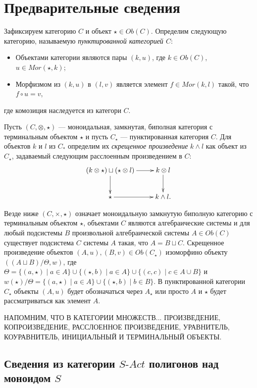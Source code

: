 \documentclass[a4paper,12pt]{article}
\newcommand{\SAct}{S\text{-}Act}
\begin{document}
\section*{Предварительные сведения}

Зафиксируем категорию $C$ и объект $\star \in Ob(C)$. Определим следующую категорию, называемую \textit{пунктированной категорией $C$}:
\begin{itemize}
    \item Объектами категории являются пары $(k,u)$, где $k \in Ob(C)$, $u \in Mor(\star,k)$;
    \item Морфизмом из $(k,u)$ в $(l,v)$ является элемент $f \in Mor(k,l)$ такой, что $f \circ u = v$,
\end{itemize}
где комозиция наследуется из категори $C$.

Пусть $(C,\otimes,\star)$ --- моноидальная, замкнутая, биполная категория с терминальным объектом $\star$ и пусть $C_\star$ --- пунктированная категория $C$. Для объектов $k$ и $l$ из $C_*$ определим их \textit{скрещенное произведение} $k \wedge l$ как объект из $C_\star$, задаваемый следующим расслоенным произведением в $C$:
$$\xymatrix{
    (k \otimes \star) \sqcup (\star \otimes l) \ar[r] \ar[d] & k \otimes l \ar[d]\\
    \star \ar[r] & k \wedge l.
}$$

Везде ниже $(C,\times,\star)$ означает моноидальную замкнутую биполную категорию с терминальным объектом $\star$, объектами $C$ являются алгебраические системы и для любый подсистемы $B$ произвольной алгебраической системы $A \in Ob(C)$ существует подсистема $C$ системы $A$ такая, что $A = B \sqcup C$. Скрещенное произведение объектов $(A,u), (B,v) \in Ob(C_\star)$ изоморфино объекту $((A \sqcup B)/\Theta, w)$, где $\Theta = \{(a,\star) \mid a \in A\} \cup \{(\star,b) \mid a \in A\} \cup \{(c,c) \mid c \in A \cup B\}$ и $w(\star)/\Theta = \{(a,\star) \mid a \in A\} \cup \{(\star,b) \mid b \in B\}$. В пунктированной категории $C_\star$ объекты $(A,u)$ будет обозначаться через $A_\star$ или просто $A$ и $\star$ будет рассматриваться как элемент $A$.

НАПОМНИМ, ЧТО В КАТЕГОРИИ МНОЖЕСТВ... ПРОИЗВЕДЕНИЕ, КОПРОИЗВЕДЕНИЕ, РАССЛОЕННОЕ ПРОИЗВЕДЕНИЕ, УРАВНИТЕЛЬ, КОУРАВНИТЕЛЬ, ИНИЦИАЛЬНЫЙ И ТЕРМИНАЛЬНЫЙ ОБЪЕКТЫ.

\subsection*{Сведения из категории $\SAct$ полигонов над моноидом $S$}
\end{document}

